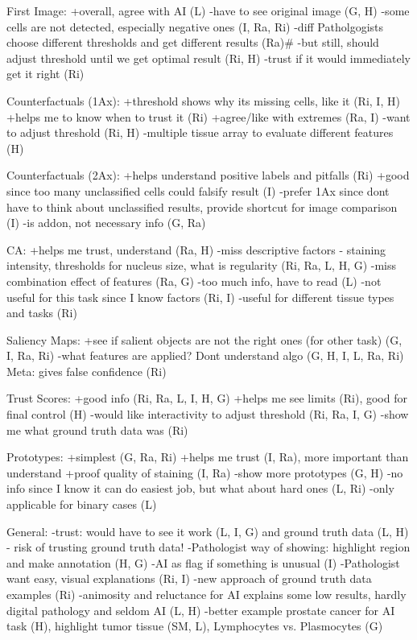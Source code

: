 First Image:
+overall, agree with AI (L)
-have to see original image (G, H)
-some cells are not detected, especially negative ones (I, Ra, Ri)
-diff Patholgogists choose different thresholds and get different results (Ra)#
-but still, should adjust threshold until we get optimal result (Ri, H) 
-trust if it would immediately get it right (Ri)

Counterfactuals (1Ax):
+threshold shows why its missing cells, like it (Ri, I, H)
+helps me to know when to trust it (Ri)
+agree/like with extremes (Ra, I)
-want to adjust threshold (Ri, H)
-multiple tissue array to evaluate different features (H)

Counterfactuals (2Ax):
+helps understand positive labels and pitfalls (Ri)
+good since too many unclassified cells could falsify result (I)
-prefer 1Ax since dont have to think about unclassified results, provide shortcut for image comparison (I)
-is addon, not necessary info (G, Ra)

CA:
+helps me trust, understand (Ra, H)
-miss descriptive factors - staining intensity, thresholds for nucleus size, what is regularity (Ri, Ra, L, H, G)
-miss combination effect of features (Ra, G)
-too much info, have to read (L)
-not useful for this task since I know factors (Ri, I)
-useful for different tissue types and tasks (Ri)

Saliency Maps:
+see if salient objects are not the right ones (for other task) (G, I, Ra, Ri)
-what features are applied? Dont understand algo (G, H, I, L, Ra, Ri)
Meta: gives false confidence (Ri)

Trust Scores:
+good info (Ri, Ra, L, I, H, G)
+helps me see limits (Ri), good for final control (H)
-would like interactivity to adjust threshold (Ri, Ra, I, G)
-show me what ground truth data was (Ri)

Prototypes:
+simplest (G, Ra, Ri)
+helps me trust (I, Ra), more important than understand
+proof quality of staining (I, Ra)
-show more prototypes (G, H)
-no info since I know it can do easiest job, but what about hard ones (L, Ri)
-only applicable for binary cases (L)

General:
-trust: would have to see it work (L, I, G) and ground truth data (L, H) - risk of trusting ground truth data!
-Pathologist way of showing: highlight region and make annotation (H, G)
-AI as flag if something is unusual (I)
-Pathologist want easy, visual explanations (Ri, I)
-new approach of ground truth data examples (Ri)
-animosity and reluctance for AI explains some low results, hardly digital pathology and seldom AI (L, H)
-better example prostate cancer for AI task (H), highlight tumor tissue (SM, L), Lymphocytes vs. Plasmocytes (G)
